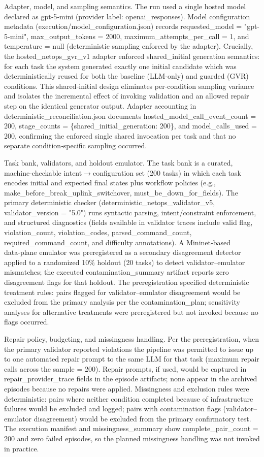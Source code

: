 \documentclass[conference]{IEEEtran}
\begin{document}
Adapter, model, and sampling semantics. The run used a single hosted model declared as gpt‑5‑mini (provider label: openai\_responses). Model configuration metadata (execution/model\_configuration.json) records requested\_model = "gpt-5-mini", max\_output\_tokens = 2000, maximum\_attempts\_per\_call = 1, and temperature = null (deterministic sampling enforced by the adapter). Crucially, the hosted\_netops\_gvr\_v1 adapter enforced shared\_initial generation semantics: for each task the system generated exactly one initial candidate which was deterministically reused for both the baseline (LLM‑only) and guarded (GVR) conditions. This shared‑initial design eliminates per‑condition sampling variance and isolates the incremental effect of invoking validation and an allowed repair step on the identical generator output. Adapter accounting in deterministic\_reconciliation.json documents hosted\_model\_call\_event\_count = 200, stage\_counts = \{shared\_initial\_generation: 200\}, and model\_calls\_used = 200, confirming the enforced single shared invocation per task and that no separate condition‑specific sampling occurred.

Task bank, validators, and holdout emulator. The task bank is a curated, machine‑checkable intent\ensuremath{\rightarrow}configuration set (200 tasks) in which each task encodes initial and expected final states plus workflow policies (e.g., make\_before\_break\_uplink\_switchover, must\_be\_down\_for\_fields). The primary deterministic checker (deterministic\_netops\_validator\_v5, validator\_version = "5.0") runs syntactic parsing, intent/constraint enforcement, and structured diagnostics (fields available in validator traces include valid flag, violation\_count, violation\_codes, parsed\_command\_count, required\_command\_count, and difficulty annotations). A Mininet‑based data‑plane emulator was preregistered as a secondary disagreement detector applied to a randomized 10\% holdout (20 tasks) to detect validator--emulator mismatches; the executed contamination\_summary artifact reports zero disagreement flags for that holdout. The preregistration specified deterministic treatment rules: pairs flagged for validator--emulator disagreement would be excluded from the primary analysis per the contamination\_plan; sensitivity analyses for alternative treatments were preregistered but not invoked because no flags occurred.

Repair policy, budgeting, and missingness handling. Per the preregistration, when the primary validator reported violations the pipeline was permitted to issue up to one automated repair prompt to the same LLM for that task (maximum repair calls across the sample = 200). Repair prompts, if used, would be captured in repair\_provider\_trace fields in the episode artifacts; none appear in the archived episodes because no repairs were applied. Missingness and exclusion rules were deterministic: pairs where neither condition completed because of infrastructure failures would be excluded and logged; pairs with contamination flags (validator--emulator disagreement) would be excluded from the primary confirmatory test. The execution manifest and missingness\_summary show complete\_pair\_count = 200 and zero failed episodes, so the planned missingness handling was not invoked in practice.
\end{document}

